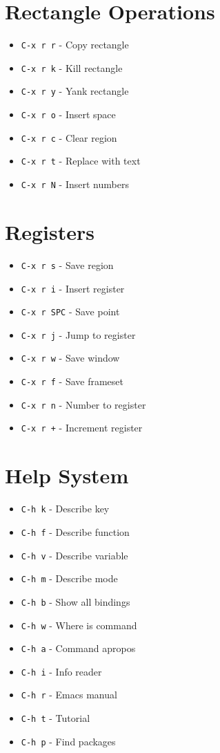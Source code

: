\documentclass[6pt,landscape]{article}
\newcommand{\key}[1]{\texttt{#1}}
\begin{document}
\begin{multicols*}{5}
\section*{Rectangle Operations}
\begin{itemize}[leftmargin=*,itemsep=0pt,parsep=0pt,topsep=0pt]
\item \key{C-x r r} - Copy rectangle
\item \key{C-x r k} - Kill rectangle
\item \key{C-x r y} - Yank rectangle
\item \key{C-x r o} - Insert space
\item \key{C-x r c} - Clear region
\item \key{C-x r t} - Replace with text
\item \key{C-x r N} - Insert numbers
\end{itemize}

\section*{Registers}
\begin{itemize}[leftmargin=*,itemsep=0pt,parsep=0pt,topsep=0pt]
\item \key{C-x r s} - Save region
\item \key{C-x r i} - Insert register
\item \key{C-x r SPC} - Save point
\item \key{C-x r j} - Jump to register
\item \key{C-x r w} - Save window
\item \key{C-x r f} - Save frameset
\item \key{C-x r n} - Number to register
\item \key{C-x r +} - Increment register
\end{itemize}

\section*{Help System}
\begin{itemize}[leftmargin=*,itemsep=0pt,parsep=0pt,topsep=0pt]
\item \key{C-h k} - Describe key
\item \key{C-h f} - Describe function
\item \key{C-h v} - Describe variable
\item \key{C-h m} - Describe mode
\item \key{C-h b} - Show all bindings
\item \key{C-h w} - Where is command
\item \key{C-h a} - Command apropos
\item \key{C-h i} - Info reader
\item \key{C-h r} - Emacs manual
\item \key{C-h t} - Tutorial
\item \key{C-h p} - Find packages
\end{itemize}


\end{multicols*}
\end{document}
